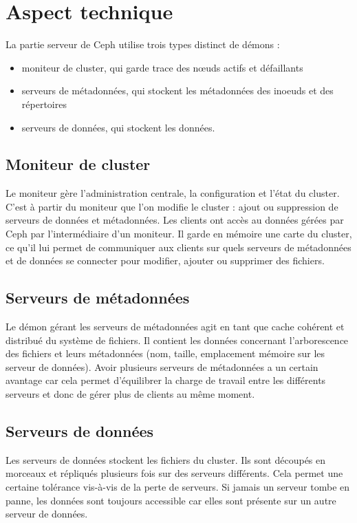 \documentclass[12pt]{report}
\begin{document}
                \section{Aspect technique}
                        
                        La partie serveur de Ceph utilise trois types distinct de démons : 
                        \begin{itemize}
                        \item moniteur de cluster, qui garde trace des nœuds actifs et défaillants
                          \item serveurs de métadonnées, qui stockent les métadonnées des inoeuds et des répertoires
                          \item serveurs de données, qui stockent les données.
                        \end{itemize}

                        \subsection{Moniteur de cluster}
                           Le moniteur gère l'administration centrale, la configuration et l'état du cluster. C'est à partir du moniteur que l'on modifie le cluster : ajout ou suppression de serveurs de données et métadonnées. Les clients ont accès au données gérées par Ceph par l'intermédiaire d'un moniteur. Il garde en mémoire une carte du cluster, ce qu'il lui permet de communiquer aux clients sur quels serveurs de métadonnées et de données se connecter pour modifier, ajouter ou supprimer des fichiers.

                        \subsection{Serveurs de métadonnées}
                           Le démon gérant les serveurs de métadonnées agit en tant que cache cohérent et distribué du système de fichiers. Il contient les données concernant l'arborescence des fichiers et leurs métadonnées (nom, taille, emplacement mémoire sur les serveur de données). Avoir plusieurs serveurs de métadonnées a un certain avantage car cela permet d'équilibrer la charge de travail entre les différents serveurs et donc de gérer plus de clients au même moment.

                        \subsection{Serveurs de données}
                           Les serveurs de données stockent les fichiers du cluster. Ils sont découpés en morceaux et répliqués plusieurs fois sur des serveurs différents. Cela permet une certaine tolérance vis-à-vis de la perte de serveurs. Si jamais un serveur tombe en panne, les données sont toujours accessible car elles sont présente sur un autre serveur de données.
\end{document}
